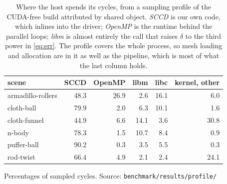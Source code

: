 \begin{table}[!tb]
  \centering
  \caption{Where the host spends its cycles, from a sampling profile of the
    CUDA-free build attributed by shared object. \emph{SCCD} is our own code,
    which inlines into the driver; \emph{OpenMP} is the runtime behind the
    parallel loops; \emph{libm} is almost entirely the call that raises $\delta$
    to the third power in \cref{eq:err}. The profile covers the whole process,
    so mesh loading and allocation are in it as well as the pipeline, which is
    most of what the last column holds.}
  \label{tab:symbols}
  \begin{tabular}{lrrrrr}
    \toprule
    scene & SCCD & OpenMP & libm & libc & kernel, other \\
    \midrule
    armadillo-rollers & 48.3 & 26.9 & 2.6 & 16.1 & 6.0 \\
    cloth-ball & 79.9 & 2.0 & 6.3 & 10.1 & 1.6 \\
    cloth-funnel & 44.9 & 6.6 & 14.1 & 3.6 & 30.8 \\
    n-body & 78.3 & 1.5 & 10.7 & 8.4 & 0.9 \\
    puffer-ball & 90.2 & 0.3 & 3.5 & 5.5 & 0.3 \\
    rod-twist & 66.4 & 4.9 & 2.1 & 2.4 & 24.1 \\
    \bottomrule
  \end{tabular}
  \par\smallskip\footnotesize Percentages of sampled cycles.
  Source: \texttt{benchmark/results/profile/}
\end{table}
